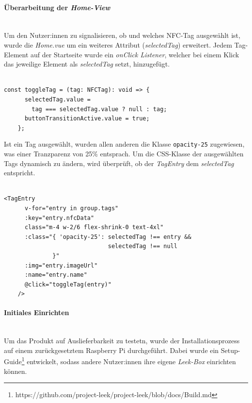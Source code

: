 \documentclass[10pt, a4paper]{article}
\begin{document}
\begin{onehalfspace}
\paragraph*{Überarbeitung der \textit{Home-View}} $~$ \\
Um den Nutzer:innen zu signalisieren, ob und welches NFC-Tag ausgewählt ist, wurde die \textit{Home.vue} um ein weiteres Attribut (\textit{selectedTag}) erweitert.
Jedem Tag-Element auf der Startseite wurde ein \textit{onClick Listener}, welcher bei einem Klick das jeweilige Element als \textit{selectedTag} setzt, hinzugefügt.
\\~\\
\begin{minipage}{\textwidth}
  \begin{lstlisting}[caption={Hervorgeben aus ausgewähltem NFC-Tag}, captionpos=b]
    const toggleTag = (tag: NFCTag): void => {
      selectedTag.value =
        tag === selectedTag.value ? null : tag;
      buttonTransitionActive.value = true;
    };
  \end{lstlisting}
\end{minipage}
Ist ein Tag ausgewählt, wurden allen anderen die Klasse \lstinline{opacity-25} zugewiesen, was einer Tranzparenz von 25\% entsprach.
Um die CSS-Klasse der ausgewählten Tags dynamisch zu ändern, wird überprüft, ob der \textit{TagEntry} dem \textit{selectedTag} entspricht.
\\~\\
\begin{minipage}{\textwidth}
  \begin{lstlisting}[caption={Caption}, captionpos=b]
    <TagEntry
      v-for="entry in group.tags"
      :key="entry.nfcData"
      class="m-4 w-2/6 flex-shrink-0 text-4xl"
      :class="{ 'opacity-25': selectedTag !== entry &&
                              selectedTag !== null
              }"
      :img="entry.imageUrl"
      :name="entry.name"
      @click="toggleTag(entry)"
    />
  \end{lstlisting}
\end{minipage}

\paragraph*{Initiales Einrichten} $~$ \\
Um das Produkt auf Auslieferbarkeit zu testetn, wurde der Installationsprozess auf einem zurückgesetztem Raspberry Pi durchgeführt.
Dabei wurde ein Setup-Guide\footnote{https://github.com/project-leek/project-leek/blob/docs/Build.md} entwickelt, sodass andere Nutzer:innen ihre eigene \textit{Leek-Box} einrichten können.


\end{onehalfspace}
\end{document}
